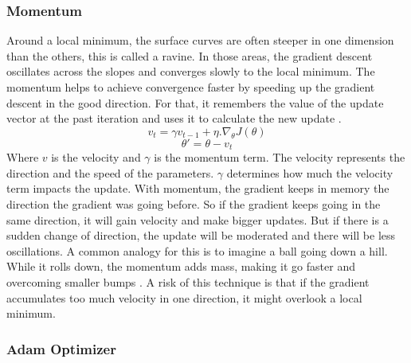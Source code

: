 \subsubsection{Momentum}
Around a local minimum, the surface curves are often steeper in one dimension than the others, this is called a ravine. In those areas, the gradient descent oscillates across the slopes and converges slowly to the local minimum. The momentum helps to achieve convergence faster by speeding up the gradient descent in the good direction. For that, it remembers the value of the update vector at the past iteration and uses it to calculate the new update \cite{optimgrad}. \[ v_t = \gamma v_{t-1} + \eta . \nabla_\theta J(\theta)  \] \[\theta' = \theta - v_t\]
Where \(v\) is the velocity and \(\gamma\) is the momentum term. The velocity represents the direction and the speed of the parameters. \(\gamma\) determines how much the velocity term impacts the update. With momentum, the gradient keeps in memory the direction the gradient was going before. So if the gradient keeps going in the same direction, it will gain velocity and make bigger updates. But if there is a sudden change of direction, the update will be moderated and there will be less oscillations. A common analogy for this is to imagine a ball going down a hill. While it rolls down, the momentum adds mass, making it go faster and overcoming smaller bumps \cite{optimgrad}. A risk of this technique is that if the gradient accumulates too much velocity in one direction, it might overlook a local minimum. 

\subsubsection{Adam Optimizer}

